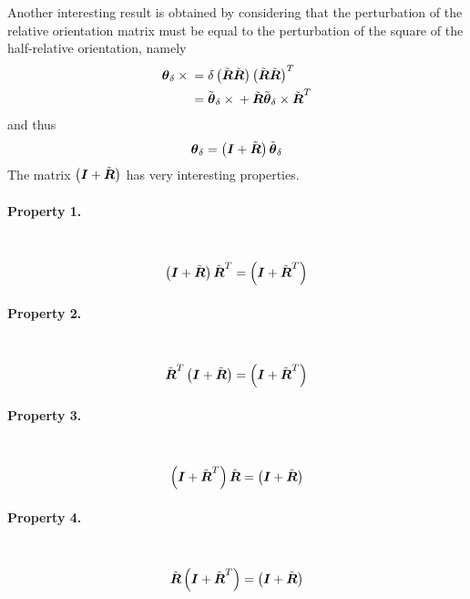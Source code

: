 \documentclass[10pt,dvips,fleqn,subeqn]{report}
\newcommand{\T}[1]{\boldsymbol{#1}}
\begin{document}
Another interesting result is obtained by considering that
the perturbation of the relative orientation matrix
must be equal to the perturbation of the square 
of the half-relative orientation, namely
\begin{align}
	\T{\theta}_{\delta} \times{}
	&= \delta\plbr{\tilde{\T{R}}\tilde{\T{R}}} \plbr{\tilde{\T{R}}\tilde{\T{R}}}^T \\
	&= \tilde{\T{\theta}}_{\delta} \times{} + \tilde{\T{R}} \tilde{\T{\theta}}_{\delta} \times \tilde{\T{R}}^T
\end{align}
and thus
\begin{equation}
	\T{\theta}_{\delta} = \plbr{\T{I} + \tilde{\T{R}}} \tilde{\T{\theta}}_{\delta}
	\label{eq:inv-def-h-theta-delta-tilde}
\end{equation}
The matrix $\plbr{\T{I} + \tilde{\T{R}}}$ has very interesting properties.

\paragraph{Property 1.} \
\begin{equation}
	\plbr{\T{I} + \tilde{\T{R}}} \tilde{\T{R}}^T = \plbr{\T{I} + \tilde{\T{R}}^T}
	\label{eq:inv-def-h-property-1}
\end{equation}

\paragraph{Property 2.} \
\begin{equation}
	\tilde{\T{R}}^T \plbr{\T{I} + \tilde{\T{R}}} = \plbr{\T{I} + \tilde{\T{R}}^T}
	\label{eq:inv-def-h-property-2}
\end{equation}

\paragraph{Property 3.} \
\begin{equation}
	\plbr{\T{I} + \tilde{\T{R}}^T} \tilde{\T{R}} = \plbr{\T{I} + \tilde{\T{R}}}
	\label{eq:inv-def-h-property-3}
\end{equation}

\paragraph{Property 4.} \
\begin{equation}
	\tilde{\T{R}} \plbr{\T{I} + \tilde{\T{R}}^T} = \plbr{\T{I} + \tilde{\T{R}}}
	\label{eq:inv-def-h-property-4}
\end{equation}
\end{document}
